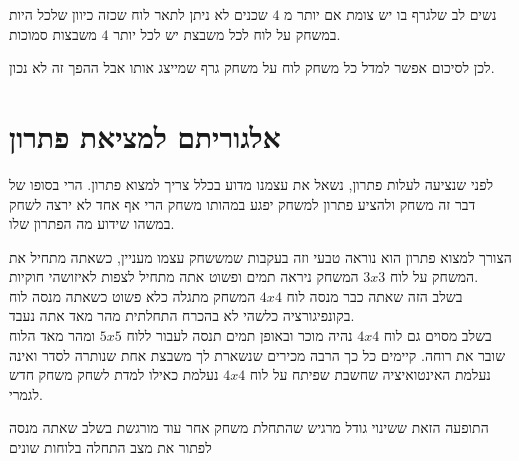 \documentclass[12pt,twoside]{article}
\begin{document}
נשים לב שלגרף בו יש צומת אם יותר מ
$4$
שכנים לא ניתן לתאר לוח שכזה כיוון שלכל היות במשחק על לוח
לכל משבצת יש לכל יותר 
$4$
משבצות סמוכות.

לכן לסיכום אפשר למדל כל משחק לוח על משחק גרף שמייצג אותו אבל 
ההפך זה לא נכון.

\newpage

\section{ אלגוריתם למציאת פתרון}
לפני שנציעה לעלות פתרון, נשאל את עצמנו מדוע בכלל צריך למצוא פתרון.
הרי בסופו של דבר זה משחק ולהציע פתרון למשחק יפגע במהותו משחק הרי אף אחד לא ירצה
לשחק במשהו שידוע מה הפתרון שלו.

הצורך למצוא פתרון הוא נוראה טבעי וזה בעקבות שמששחק עצמו מעניין, כשאתה מתחיל 
את המשחק על לוח 
$3x3$
המשחק ניראה תמים ופשוט אתה מתחיל לצפות לאיזושהי חוקיות.
\\
בשלב הזה שאתה כבר מנסה לוח 
$4x4$
המשחק מתגלה כלא פשוט כשאתה מנסה לוח בקונפיגורציה כלשהי לא בהכרח התחלתית
מהר מאד אתה נעבד.
\\
בשלב מסוים גם לוח 
$4x4$
נהיה מוכר ובאופן תמים תנסה לעבור ללוח
$5x5$
ומהר מאד הלוח שובר את רוחה.
קיימים כל כך הרבה מכירים שנשארת לך משבצת אחת שנותרה לסדר ואינה נעלמת
האינטואיציה שחשבת שפיתח על לוח 
$4x4$
נעלמת כאילו למדת לשחק משחק חדש לגמרי.

התופעה הזאת ששינוי גודל מרגיש שהתחלת משחק אחר עוד
מורגשת בשלב שאתה מנסה לפתור את מצב התחלה בלוחות שונים
\end{document}
